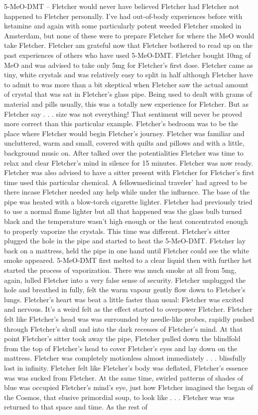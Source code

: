 \documentclass[12pt]{book}
\begin{document}
5-MeO-DMT -- Fletcher would never have believed Fletcher had Fletcher not happened to Fletcher personally. I've had out-of-body experiences before with ketamine and again with some particularly potent weeded Fletcher smoked in Amsterdam, but none of these were to prepare Fletcher for where the MeO would take Fletcher. Fletcher am grateful now that Fletcher bothered to read up on the past experiences of others who have used 5-MeO-DMT. Fletcher bought 10mg of MeO and was advised to take only 5mg for Fletcher's first dose. Fletcher came as tiny, white crystals and was relatively easy to split in half although Fletcher have to admit to was more than a bit skeptical when Fletcher saw the actual amount of crystal that was sat in Fletcher's glass pipe. Being used to dealt with grams of material and pills usually, this was a totally new experience for Fletcher. But as Fletcher say . . .  size was not everything! That sentiment will never be proved more correct than this particular example. Fletcher's bedroom was to be the place where Fletcher would begin Fletcher's journey. Fletcher was familiar and uncluttered, warm and small, covered with quilts and pillows and with a little, background music on. After talked over the potentialities Fletcher was time to relax and clear Fletcher's mind in silence for 15 minutes. Fletcher was now ready. Fletcher was also advised to have a sitter present with Fletcher for Fletcher's first time used this particular chemical. A fellowmedicinal traveler' had agreed to be there incase Fletcher needed any help while under the influence. The base of the pipe was heated with a blow-torch cigarette lighter. Fletcher had previously tried to use a normal flame lighter but all that happened was the glass bulb turned black and the temperature wasn't high enough or the heat concentrated enough to properly vaporize the crystals. This time was different. Fletcher's sitter plugged the hole in the pipe and started to heat the 5-MeO-DMT. Fletcher lay back on a mattress, held the pipe in one hand until Fletcher could see the white smoke appeared. 5-MeO-DMT first melted to a clear liquid then with further het started the process of vaporization. There was much smoke at all from 5mg, again, lulled Fletcher into a very false sense of security. Fletcher unplugged the hole and breathed in fully, felt the warm vapour gently flow down to Fletcher's lungs. Fletcher's heart was beat a little faster than usual: Fletcher was excited and nervous. It's a weird felt as the effect started to overpower Fletcher. Fletcher felt like Fletcher's head was was surrounded by needle-like probes, rapidly pushed through Fletcher's skull and into the dark recesses of Fletcher's mind. At that point Fletcher's sitter took away the pipe, Fletcher pulled down the blindfold from the top of Fletcher's head to cover Fletcher's eyes and lay down on the mattress. Fletcher was completely motionless almost immediately . . .  blissfully lost in infinity. Fletcher felt like Fletcher's body was deflated, Fletcher's essence was was sucked from Fletcher. At the same time, swirled patterns of shades of blue was occupied Fletcher's mind's eye, just how Fletcher imagined the began of the Cosmos, that elusive primordial soup, to look like . . .  Fletcher was was returned to that space and time. As the rest of 
\end{document}
